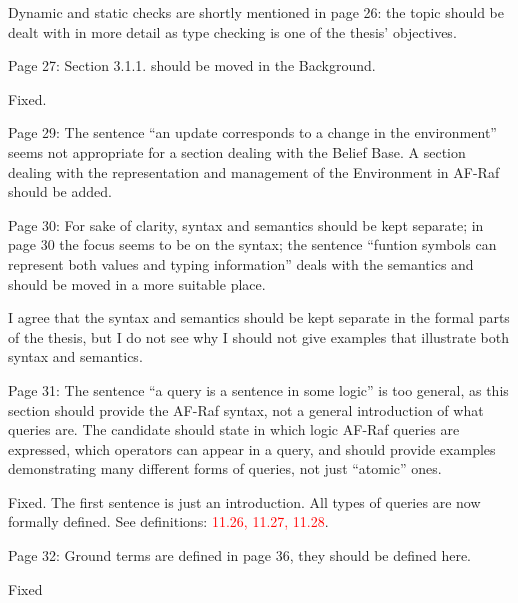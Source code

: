 \documentclass{article}
\newcommand*\R[1]{\textcolor{red}{#1}} %
\newcommand{\todo}[1]{[\textcolor{green}{TODO}: #1]}
\newenvironment{them}{\noindent\begingroup\color{blue}}{\endgroup\par}
\begin{document}
\begin{them}

Dynamic and static checks are shortly mentioned in page 26: the topic should be
dealt with in more detail as type checking is one of the thesis' objectives.

\end{them}
\todo{}

\begin{them}

Page 27:
Section 3.1.1. should be moved in the Background.
\end{them}
Fixed. 

\begin{them}

Page 29:
The sentence “an update corresponds to a change in the environment” seems not
appropriate for a section dealing with the Belief Base. A section dealing with
the representation and management of the Environment in AF-Raf should be added.

\end{them}
\todo{}

\begin{them}

Page 30:
For sake of clarity, syntax and semantics should be kept separate; in page 30
the focus seems to be on the syntax; the sentence “funtion symbols can
represent both values and typing information” deals with the semantics and
should be moved in a more suitable place.

\end{them}
I agree that the syntax and semantics should be kept separate in the formal
parts of the thesis, but I do not see why I should not give examples that
illustrate both syntax and semantics.

\begin{them}

Page 31:
The sentence “a query is a sentence in some logic” is too general, as this
section should provide the AF-Raf syntax, not a general introduction of what
queries are. The candidate should state in which logic AF-Raf queries are
expressed, which operators can appear in a query, and should provide examples
demonstrating many different forms of queries, not just “atomic” ones.

\end{them}
Fixed. The first sentence is just an introduction. All types of queries are now
formally defined. See definitions: \R{11.26, 11.27, 11.28}.

\begin{them}

Page 32:
Ground terms are defined in page 36, they should be defined here.
\end{them}
Fixed
\end{document}
